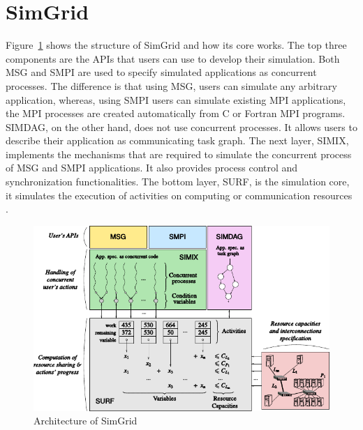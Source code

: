 \section{SimGrid}
\label{section:simgrid} 
Figure~\ref{fig:SimGrid} shows the structure of SimGrid and how its core works. The top three components are the APIs that users can use to develop their simulation. Both MSG and SMPI are used to specify simulated applications as concurrent processes. The difference is that using MSG, users can simulate any arbitrary application, whereas, using SMPI users can simulate existing MPI applications, the MPI processes are created automatically from C or Fortran MPI programs. SIMDAG, on the other hand, does not use concurrent processes. It allows users to describe their application as communicating task graph. The next layer, SIMIX, implements the mechanisms that are required to simulate the concurrent process of MSG and SMPI applications. It also provides process control and synchronization functionalities. The bottom layer, SURF, is the simulation core, it simulates the execution of activities on computing or communication resources \cite{DBLP:journals/jpdc/CasanovaGLQS14}.
\begin{figure}[ht]
	\begin{center}
		\includegraphics{images/SimGrid.pdf}
		\caption{Architecture of SimGrid \cite{DBLP:journals/jpdc/CasanovaGLQS14}}
		\label{fig:SimGrid}
	\end{center}
\end{figure}
